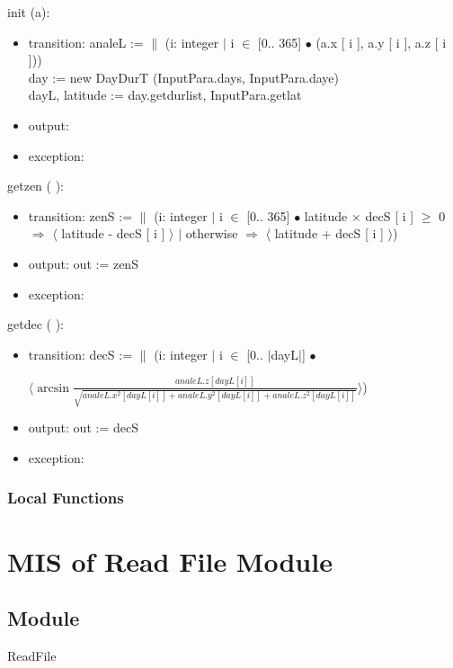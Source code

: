 \documentclass[12pt, titlepage]{article}
\begin{document}
\noindent {}init (a):
\begin{itemize}
\item transition: analeL := $\|$ (i: integer $|$ i $\in$ [0.. 365] $\bullet	$ (a.x [ i ], a.y [ i ], a.z [ i ]))\\
day := new DayDurT (InputPara.days, InputPara.daye)\\
dayL, latitude := day.getdurlist, InputPara.getlat\\

\item output: 
\item exception: 
\end{itemize}

\noindent  getzen ( ):
\begin{itemize}
\item transition: zenS := $\|$ (i: integer $|$ i $\in$ [0.. 365] $\bullet$ latitude $\times$ decS [ i ] $\geq$ 0 $\Rightarrow$ $\langle$ latitude - decS [  i ] $\rangle$ $|$ otherwise $\Rightarrow$ $\langle$ latitude + decS [ i ] $\rangle$)

\item output: out := zenS
\item exception: 
\end{itemize}


\noindent  getdec ( ):
\begin{itemize}
\item transition: decS := $\|$ (i: integer $|$ i $\in$ [0.. $|$dayL$|$] $\bullet$ 
\begin{center}\large{
$	\langle \arcsin \frac{analeL.z [dayL[ i ] ]}{ \sqrt{analeL.x^2 [ dayL[ i ] ] + analeL.y^2 [ dayL[ i ] ] + analeL.z^2 [ dayL[ i ] ]}} \rangle$)}
\end{center}
\item output: out := decS
\item exception: 
\end{itemize}

\subsubsection{Local Functions}

\newpage

\section{MIS of Read File Module} \label{ModuleSD} 

\subsection{Module}
ReadFile
\end{document}
